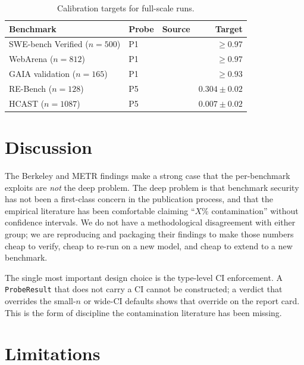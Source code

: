 \documentclass[11pt]{article}
\begin{document}
\begin{table}[t]
\centering
\caption{Calibration targets for full-scale runs.}
\label{tab:calibration-targets}
\begin{tabular}{lllr}
\toprule
Benchmark & Probe & Source & Target \\
\midrule
SWE-bench Verified ($n{=}500$) & P1 & \citep{wang2026benchjack} & $\geq 0.97$ \\
WebArena ($n{=}812$)           & P1 & \citep{wang2026benchjack} & $\geq 0.97$ \\
GAIA validation ($n{=}165$)    & P1 & \citep{wang2026benchjack} & $\geq 0.93$ \\
RE-Bench ($n{=}128$)           & P5 & \citep{metr2025rewardhacking} & $0.304 \pm 0.02$ \\
HCAST ($n{=}1087$)             & P5 & \citep{metr2025rewardhacking} & $0.007 \pm 0.02$ \\
\bottomrule
\end{tabular}
\end{table}

\section{Discussion}

The Berkeley and METR findings make a strong case that the per-benchmark
exploits are \emph{not} the deep problem. The deep problem is that
benchmark security has not been a first-class concern in the publication
process, and that the empirical literature has been comfortable claiming
``$X\%$ contamination'' without confidence intervals. We do not have a
methodological disagreement with either group; we are reproducing and
packaging their findings to make those numbers cheap to verify, cheap to
re-run on a new model, and cheap to extend to a new benchmark.

The single most important design choice is the type-level CI enforcement.
A \texttt{ProbeResult} that does not carry a CI cannot be constructed; a
verdict that overrides the small-$n$ or wide-CI defaults shows that
override on the report card. This is the form of discipline the
contamination literature has been missing.

\section{Limitations}
\end{document}
